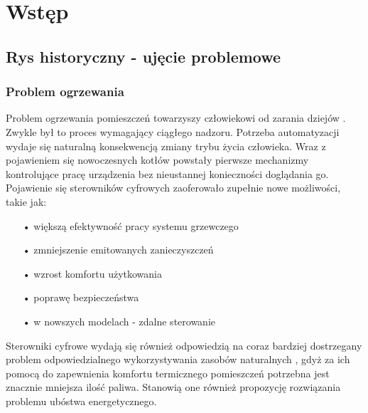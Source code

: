 \documentclass[11pt]{report}
\begin{document}
 \begin{titlepage}
 \vspace{0.1\textheight}
 \bigskip
 \vspace{0.3\textheight}
 \par

 \vspace{0.1\textheight}
 \end{titlepage}


 \tableofcontents


 \chapter{Wstęp}
 
 \section{Rys historyczny - ujęcie problemowe}
 \subsection{Problem ogrzewania}
 Problem ogrzewania pomieszczeń towarzyszy człowiekowi od zarania dziejów \cite{Hoppe2018}. Zwykle był to proces wymagający ciągłego nadzoru. Potrzeba automatyzacji wydaje się naturalną konsekwencją zmiany trybu życia człowieka. Wraz z pojawieniem się nowoczesnych kotłów powstały pierwsze mechanizmy kontrolujące pracę urządzenia bez nieustannej konieczności doglądania go.
 Pojawienie się sterowników cyfrowych zaoferowało zupełnie nowe możliwości, takie jak:
  \begin{enumerate}
 \item[•] większą efektywność pracy systemu grzewczego
 \item[•] zmniejszenie emitowanych zanieczyszczeń
 \item[•] wzrost komfortu użytkowania
 \item[•] poprawę bezpieczeństwa
 \item[•] w nowszych modelach - zdalne sterowanie
  \end{enumerate}
 Sterowniki cyfrowe wydają się również odpowiedzią na coraz bardziej dostrzegany problem odpowiedzialnego wykorzystywania zasobów naturalnych \cite{Mazurek2018}\cite{Mazurek2018a}, gdyż za ich pomocą do zapewnienia komfortu termicznego pomieszczeń potrzebna jest znacznie mniejsza ilość paliwa. Stanowią one również propozycję rozwiązania problemu ubóstwa energetycznego.
\end{document}
